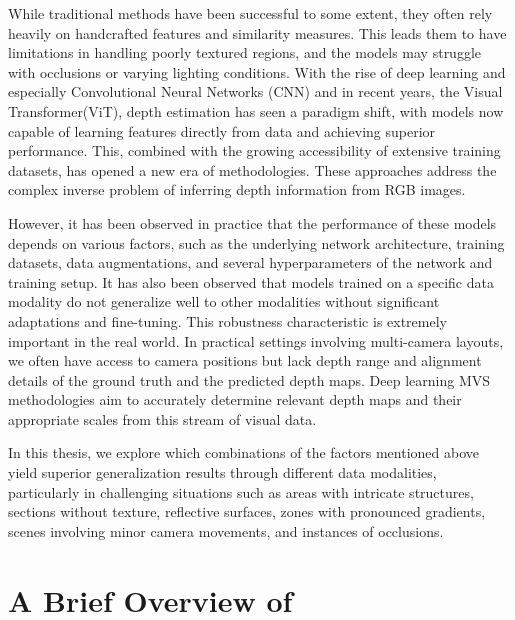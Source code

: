     While traditional {\mvs} methods have been successful to some extent, they often rely heavily on handcrafted features and similarity measures. This leads them to have limitations in handling poorly textured regions, and the models may struggle with occlusions or varying lighting conditions. With the rise of deep learning and especially Convolutional Neural Networks (CNN)\cite{lecun1997} and in recent years, the Visual Transformer(ViT)\cite{dosovitskiy2021image, ranftl2021vision, amir2021deep}, depth estimation has seen a paradigm shift, with models now capable of learning features directly from data and achieving superior performance. This, combined with the growing accessibility of extensive training datasets, has opened a new era of {\mvs} methodologies\cite{Seitz2006}. These approaches address the complex inverse problem of inferring depth information from RGB images.\par
    However, it has been observed in practice that the performance of these models depends on various factors, such as the underlying network architecture, training datasets, data augmentations, and several hyperparameters of the network and training setup. It has also been observed that models trained on a specific data modality do not generalize well to other modalities without significant adaptations and fine-tuning. This robustness characteristic is extremely important in the real world. In practical settings involving multi-camera layouts, we often have access to camera positions but lack depth range and alignment details of the ground truth and the predicted depth maps. Deep learning MVS methodologies aim to accurately determine relevant depth maps and their appropriate scales from this stream of visual data.\par 
    In this thesis, we explore which combinations of the factors mentioned above yield superior generalization results through different data modalities, particularly in challenging situations such as areas with intricate structures, sections without texture, reflective surfaces, zones with pronounced gradients, scenes involving minor camera movements, and instances of occlusions.


\section{A Brief Overview of \rmvd}\label{sec:A brief overview of \rmvd}

